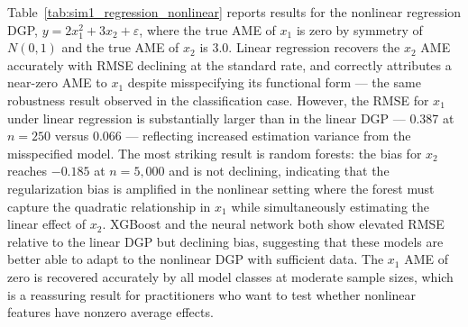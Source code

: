 \documentclass[12pt]{article}
\begin{document}
	Table~\ref{tab:sim1_regression_nonlinear} reports results for the nonlinear regression DGP, $y = 2x_1^2 + 3x_2 + \varepsilon$, where the true AME of $x_1$ is zero by symmetry of $N(0,1)$ and the true AME of $x_2$ is 3.0. Linear regression recovers the $x_2$ AME accurately with RMSE declining at the standard rate, and correctly attributes a near-zero AME to $x_1$ despite misspecifying its functional form --- the same robustness result observed in the classification case. However, the RMSE for $x_1$ under linear regression is substantially larger than in the linear DGP --- 0.387 at $n=250$ versus 0.066 --- reflecting increased estimation variance from the misspecified model. The most striking result is random forests: the bias for $x_2$ reaches $-0.185$ at $n=5{,}000$ and is not declining, indicating that the regularization bias is amplified in the nonlinear setting where the forest must capture the quadratic relationship in $x_1$ while simultaneously estimating the linear effect of $x_2$. XGBoost and the neural network both show elevated RMSE relative to the linear DGP but declining bias, suggesting that these models are better able to adapt to the nonlinear DGP with sufficient data. The $x_1$ AME of zero is recovered accurately by all model classes at moderate sample sizes, which is a reassuring result for practitioners who want to test whether nonlinear features have nonzero average effects.
	
\end{document}
